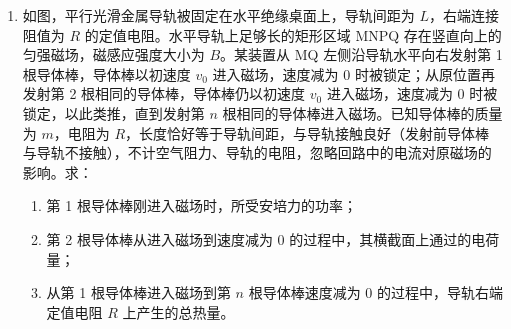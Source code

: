 \documentclass[\gkver]{gaokaozhenti}
\begin{document}
\begin{enumerate}
{从最低点到该位置由动能定理 $\frac{1}{2}mv_{0}'^{2} = mg \cdot 5L + \frac{1}{2}mv'^{2}$

解得 $v_{0}' = 2\sqrt{15} \Ums$
}

\item
如图，平行光滑金属导轨被固定在水平绝缘桌面上，导轨间距为 $L$，右端连接阻值为 $R$ 的定值电阻。水平导轨上足够长的矩形区域 MNPQ 存在竖直向上的匀强磁场，磁感应强度大小为 $B$。某装置从 MQ 左侧沿导轨水平向右发射第 1 根导体棒，导体棒以初速度 $v_{0}$ 进入磁场，速度减为 0 时被锁定；从原位置再发射第 2 根相同的导体棒，导体棒仍以初速度 $v_{0}$ 进入磁场，速度减为 0 时被锁定，以此类推，直到发射第 $n$ 根相同的导体棒进入磁场。已知导体棒的质量为 $m$，电阻为 $R$，长度恰好等于导轨间距，与导轨接触良好（发射前导体棒与导轨不接触），不计空气阻力、导轨的电阻，忽略回路中的电流对原磁场的影响。求：
\begin{enumerate}
\item
第 1 根导体棒刚进入磁场时，所受安培力的功率；
\item
第 2 根导体棒从进入磁场到速度减为 0 的过程中，其横截面上通过的电荷量；
\item
从第 1 根导体棒进入磁场到第 $n$ 根导体棒速度减为 0 的过程中，导轨右端定值电阻 $R$ 上产生的总热量。
\end{enumerate}

\onepicture[w=7.00cm, align=right]{}

\end{enumerate}
\end{document}
